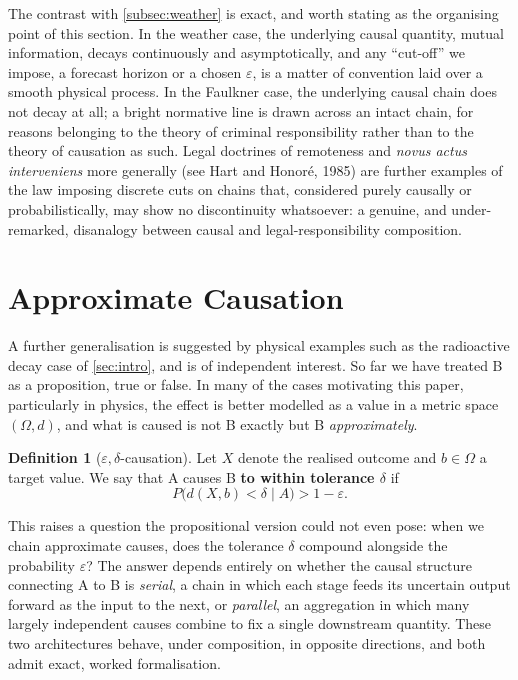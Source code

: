 \documentclass[11pt]{article}
\theoremstyle{definition}
\newtheorem{definition}{Definition}[section]
\newcommand{\eps}{\varepsilon}
\begin{document}
The contrast with \cref{subsec:weather} is exact, and worth stating as the organising point of this section. In the weather case, the underlying causal quantity, mutual information, decays continuously and asymptotically, and any ``cut-off'' we impose, a forecast horizon or a chosen $\eps$, is a matter of convention laid over a smooth physical process. In the Faulkner case, the underlying causal chain does not decay at all; a bright normative line is drawn across an intact chain, for reasons belonging to the theory of criminal responsibility rather than to the theory of causation as such. Legal doctrines of remoteness and \emph{novus actus interveniens} more generally (see Hart and Honor\'e, 1985) are further examples of the law imposing discrete cuts on chains that, considered purely causally or probabilistically, may show no discontinuity whatsoever: a genuine, and under-remarked, disanalogy between causal and legal-responsibility composition.

\section{Approximate Causation}
\label{sec:approx}

A further generalisation is suggested by physical examples such as the radioactive decay case of \cref{sec:intro}, and is of independent interest. So far we have treated B as a proposition, true or false. In many of the cases motivating this paper, particularly in physics, the effect is better modelled as a value in a metric space $(\Omega,d)$, and what is caused is not B exactly but B \emph{approximately}.

\begin{definition}[$\eps,\delta$-causation]
\label{def:eps-delta}
Let $X$ denote the realised outcome and $b\in\Omega$ a target value. We say that A causes B \textbf{to within tolerance $\delta$} if
\[
P\big(d(X,b)<\delta \mid A\big) > 1-\eps.
\]
\end{definition}

This raises a question the propositional version could not even pose: when we chain approximate causes, does the tolerance $\delta$ compound alongside the probability $\eps$? The answer depends entirely on whether the causal structure connecting A to B is \emph{serial}, a chain in which each stage feeds its uncertain output forward as the input to the next, or \emph{parallel}, an aggregation in which many largely independent causes combine to fix a single downstream quantity. These two architectures behave, under composition, in opposite directions, and both admit exact, worked formalisation.
\end{document}

